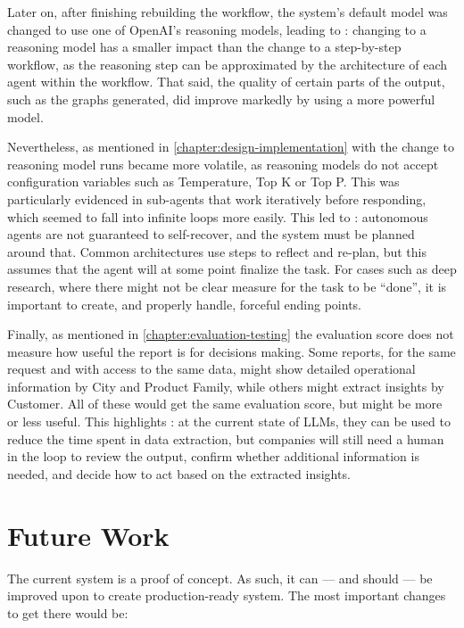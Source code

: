 \documentclass[a4paper]{report}
\begin{document}
Later on, after finishing rebuilding the workflow, the system's default model was changed to use one of OpenAI's reasoning models, leading to \kfid : changing to a reasoning model has a smaller impact than the change to a step-by-step workflow, as the reasoning step can be approximated by the architecture of each agent within the workflow. That said, the quality of certain parts of the output, such as the graphs generated, did improve markedly by using a more powerful model.

Nevertheless, as mentioned in \autoref{chapter:design-implementation} with the change to reasoning model runs became more volatile, as reasoning models do not accept configuration variables such as Temperature, Top K or Top P. This was particularly evidenced in sub-agents that work iteratively before responding, which seemed to fall into infinite loops more easily. This led to \kfid : autonomous agents are not guaranteed to self-recover, and the system must be planned around that. Common architectures use steps to reflect and re-plan, but this assumes that the agent will at some point finalize the task. For cases such as deep research, where there might not be clear measure for the task to be ``done'', it is important to create, and properly handle, forceful ending points.

Finally, as mentioned in \autoref{chapter:evaluation-testing} the evaluation score does not measure how useful the report is for decisions making. Some reports, for the same request and with access to the same data, might show detailed operational information by City and Product Family, while others might extract insights by Customer. All of these would get the same evaluation score, but might be more or less useful. This highlights \kfid : at the current state of LLMs, they can be used to reduce the time spent in data extraction, but companies will still need a human in the loop to review the output, confirm whether additional information is needed, and decide how to act based on the extracted insights.

\section{Future Work}
\label{sec:future-work}

The current system is a proof of concept. As such, it can --- and should --- be improved upon to create production-ready system. The most important changes to get there would be:
\end{document}
